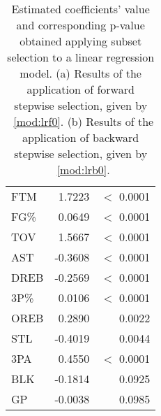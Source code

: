 \begin{table}[H]
\begin{subtable}[h]{0.4\textwidth}
\begin{tabular}{|| l | r | r ||}
			FTM & 1.7223 & $<$ 0.0001 \\
			FG\% & 0.0649 & $<$ 0.0001 \\
			TOV & 1.5667 & $<$ 0.0001 \\
			AST & -0.3608 & $<$ 0.0001 \\
			DREB & -0.2569 & $<$ 0.0001 \\
			3P\% & 0.0106 & $<$ 0.0001 \\
			OREB & 0.2890 & 0.0022 \\
			STL & -0.4019 & 0.0044 \\
			3PA & 0.4550 & $<$ 0.0001 \\
			BLK & -0.1814 & 0.0925 \\
			GP & -0.0038 & 0.0985 \\
			\hline
		\end{tabular}
		\caption{}
		\label{table:BackwardModelSummary}
	\end{subtable}
	\caption{Estimated coefficients' value and corresponding p-value obtained applying subset selection to a linear regression model. (a) Results of the application of forward stepwise selection, given by \Mod~\ref{mod:lrf0}. (b) Results of the application of backward stepwise selection, given by \Mod~\ref{mod:lrb0}.}
	\label{table:SubSelModSum}
\end{table}

\begin{center}
\end{center}

\begin{center}
\end{center}

